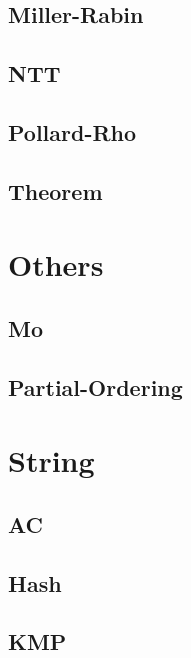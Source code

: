 \documentclass[a4paper,10pt,twocolumn,oneside]{article}
\begin{document}
\subsection{Miller-Rabin}


\subsection{NTT}


\subsection{Pollard-Rho}


\subsection{Theorem}


\section{Others}
\subsection{Mo}


\subsection{Partial-Ordering}


\section{String}
\subsection{AC}

\subsection{Hash}


\subsection{KMP}

\end{document}
